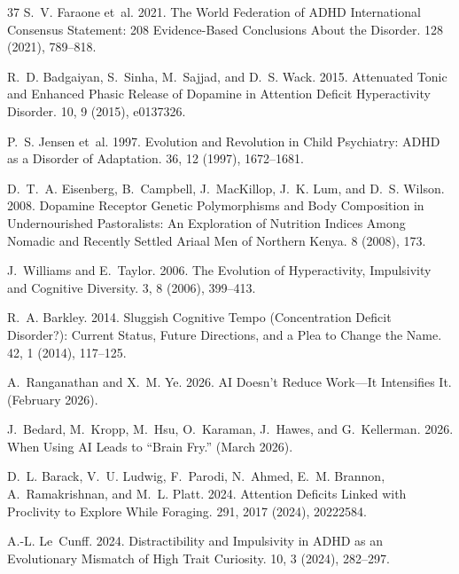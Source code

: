 \documentclass[sigconf,nonacm]{acmart}
\begin{document}
\begin{thebibliography}{37}
S.~V. Faraone et~al. 2021.
\newblock The World Federation of ADHD International Consensus Statement: 208 Evidence-Based Conclusions About the Disorder.
 128 (2021), 789--818.

R.~D. Badgaiyan, S.~Sinha, M.~Sajjad, and D.~S. Wack. 2015.
\newblock Attenuated Tonic and Enhanced Phasic Release of Dopamine in Attention Deficit Hyperactivity Disorder.
 10, 9 (2015), e0137326.

P.~S. Jensen et~al. 1997.
\newblock Evolution and Revolution in Child Psychiatry: ADHD as a Disorder of Adaptation.
 36, 12 (1997), 1672--1681.

D.~T.~A. Eisenberg, B.~Campbell, J.~MacKillop, J.~K. Lum, and D.~S. Wilson. 2008.
\newblock Dopamine Receptor Genetic Polymorphisms and Body Composition in Undernourished Pastoralists: An Exploration of Nutrition Indices Among Nomadic and Recently Settled Ariaal Men of Northern Kenya.
 8 (2008), 173.

J.~Williams and E.~Taylor. 2006.
\newblock The Evolution of Hyperactivity, Impulsivity and Cognitive Diversity.
 3, 8 (2006), 399--413.

R.~A. Barkley. 2014.
\newblock Sluggish Cognitive Tempo (Concentration Deficit Disorder?): Current Status, Future Directions, and a Plea to Change the Name.
 42, 1 (2014), 117--125.

A.~Ranganathan and X.~M. Ye. 2026.
\newblock AI Doesn't Reduce Work---It Intensifies It.
 (February 2026).

J.~Bedard, M.~Kropp, M.~Hsu, O.~Karaman, J.~Hawes, and G.~Kellerman. 2026.
\newblock When Using AI Leads to ``Brain Fry.''
 (March 2026).

D.~L. Barack, V.~U. Ludwig, F.~Parodi, N.~Ahmed, E.~M. Brannon, A.~Ramakrishnan, and M.~L. Platt. 2024.
\newblock Attention Deficits Linked with Proclivity to Explore While Foraging.
 291, 2017 (2024), 20222584.

A.-L. Le~Cunff. 2024.
\newblock Distractibility and Impulsivity in ADHD as an Evolutionary Mismatch of High Trait Curiosity.
 10, 3 (2024), 282--297.


\end{thebibliography}
\end{document}
